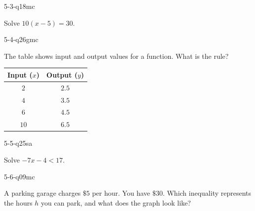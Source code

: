 \begin{practiceQuestion}{5-3-q18}{mc}
\begin{questionText}
Solve $10(x - 5) = 30$.
\end{questionText}
\end{practiceQuestion}

\begin{practiceQuestion}{5-4-q26}{gmc}
\begin{questionText}
The table shows input and output values for a function. What is the rule?

\begin{center}
\begin{tabular}{|c|c|}
\hline
\textbf{Input ($x$)} & \textbf{Output ($y$)} \\
\hline
$2$ & $2.5$ \\
\hline
$4$ & $3.5$ \\
\hline
$6$ & $4.5$ \\
\hline
$10$ & $6.5$ \\
\hline
\end{tabular}
\end{center}
\end{questionText}
\end{practiceQuestion}

\begin{practiceQuestion}{5-5-q25}{sa}
\begin{questionText}
Solve $-7x - 4 < 17$.
\end{questionText}
\end{practiceQuestion}

\begin{practiceQuestion}{5-6-q09}{mc}
\begin{questionText}
A parking garage charges $\$5$ per hour. You have $\$30$. Which inequality represents the hours $h$ you can park, and what does the graph look like?
\end{questionText}
\end{practiceQuestion}

